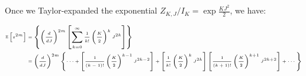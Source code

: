 Once we Taylor-expanded the exponential $Z_{K,J}/I_K = \exp{\frac{KJ^2}{2}}$, we have:


\begin{equation}
    \tiny
    \begin{split}
        \mathbb{E}\left[z^{2m}\right] 
            &= \left \{ 
                    \left ( \frac{d}{dJ}\right )^{2m}
                    \left [ \sum_{k=0}^\infty{
                        \frac{1}{k!} 
                        \left ( \frac{K}{2} \right )^k 
                        J^{2k}
                    }
                    \right ]
                \right \} \\
            &= 
                \left ( \frac{d}{dJ}\right )^{2m}
                \left \{ 
                    \cdots +
                    \left [
                        \frac{1}{(k-1)!} 
                        \left ( \frac{K}{2} \right )^{k-1} 
                        J^{2k-2}
                    \right ] +
                    \left [
                        \frac{1}{k!} 
                        \left ( \frac{K}{2} \right )^k
                        J^{2k}
                    \right ]
                    \left [
                        \frac{1}{(k+1)!} 
                        \left ( \frac{K}{2} \right )^{k+1} 
                        J^{2k+2}
                    \right ] +
                    \cdots
                \right \} \\
    \end{split}
\end{equation}
